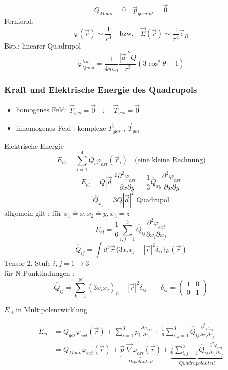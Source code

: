 \documentclass[titlepage,12pt,a4paper,ngerman]{report}
\begin{document}
$$Q_{Mono} = 0  \quad \vec{p}_{gesamt} = \vec{0}$$
Fernferld: $$ \varphi(\vec{r}) \sim \frac{1}{r^3} \quad \textrm{bzw.} \quad \vec{E} (\vec{r}) \sim \frac{1}{r^4} \vec{e}_R$$
Bsp.: linearer Quadrupol
$$\varphi^{lin}_{Quad} = \frac{1}{4\pi\epsilon_0} \frac{|\vec{a}|^2Q}{r^3} (3 \cos^2\theta -1)$$
\subsubsection{Kraft und Elektrische Energie des Quadrupols}
\begin{itemize}
\item homogenes Feld: $\vec{F}_{ges} = \vec{0} \quad ; \quad \vec{T}_{ges} = \vec{0}$
\item inhomogenes Feld : komplexe $\vec{F}_{ges}$ , $\vec{T}_{ges}$
\end{itemize}
Elektrische Energie
$$ E_{el} = \sum ^4_{i=1} Q_i \varphi_{ext}(\vec{r}_i) \quad \textrm{(eine kleine Rechnung)}$$
$$ E_{el} = Q |\vec{d}|^2 \frac{\partial ^2 \varphi_{ext}}{\partial x \partial y} = \frac{1}{3} \hat{Q}_{xy} \frac{\partial ^2 \varphi_{ext}}{\partial x \partial y} $$
$$\hat{Q}_{x_1} = 3 Q |\vec{d}|^2 \textrm{ Quadrupol}$$
allgemein gilt : 
für $ x_1 \widehat{=} x, x_2 \widehat{=} y, x_3 \widehat{=} z$
$$E_{el} = \frac{1}{6} \sum^3_{i,j=1} \hat{Q}_{ij} \frac{\partial ^2 \varphi_{ext}}{\partial x_i \partial x_j}$$
$$\hat{Q}_{ij} = \int d^3 \vec{r} \{ 3x_ix_j - |\vec{r}|^2 \delta_{ij} \} \rho (\vec{r})$$
Tensor 2. Stufe $i,j = 1 \rightarrow 3$\\
für N Punktladungen : $$\hat{Q}_{ij} = \sum^N_{k=1} (3x_ix_j)_n - |\vec{r}|^2 \delta_{ij} \qquad \delta_{ij}= \begin{pmatrix}
1 & 0 \\
0 & 1 
\end{pmatrix}$$

$E_{el}$ in Multipolentwicklung

\begin{align*}
E_{el} &= Q_{ges} \varphi_{ext} (\vec{r})  + \sum^3_{i=1} p_i \frac{\partial \varphi_{ext}}{\partial x_i} + \frac{1}{6} \sum^3_{i,j = 1} \hat{Q}_{ij} \frac{\partial ^2 \varphi_{ext}}{\partial x_i \partial x_j} \\
&= Q_{Mono} \varphi_{ext}(\vec{r}) + \underbrace{\vec{p} \; \vec{\nabla} \varphi_{ext} (\vec{r})}_{Dipolanteil} + \underbrace{ \frac{1}{6} \sum^3_{i,j = 1} \hat{Q}_{ij} \frac{\partial ^2 \varphi_{ext}}{\partial x_i \partial x_j} }_{Quadrupolanteil}
\end{align*}
\end{document}
